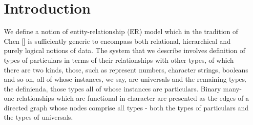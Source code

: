  \section{Introduction}

We  define a notion of entity-relationship (ER) model which in the tradition of Chen [] is sufficiently generic to encompass both relational, hierarchical and purely logical  notions of data.
The system that we describe involves definition of types of particulars in terms of their relationships with other types, of which there are two kinds, those, such as represent numbers, character strings, booleans and so on, all of whose instances, we say, are universals and the remaining types, the definienda, those types all of whose instances are particulars. Binary many-one relationships which are functional in character are presented as the edges of a directed graph whose nodes comprise all types - both the types of particulars and the types of universals. 

